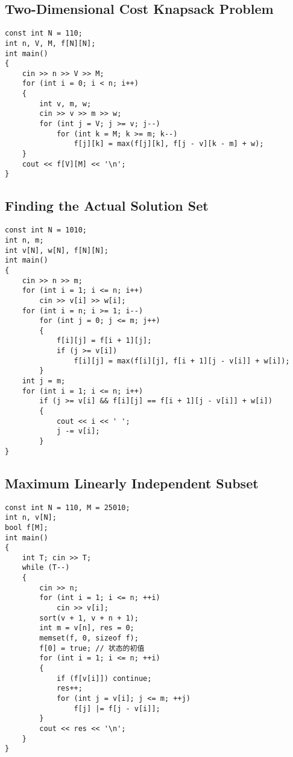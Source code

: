 \subsection{Two-Dimensional Cost Knapsack Problem}
\begin{lstlisting}
const int N = 110;
int n, V, M, f[N][N];
int main()
{
    cin >> n >> V >> M;
    for (int i = 0; i < n; i++)
    {
        int v, m, w;
        cin >> v >> m >> w;
        for (int j = V; j >= v; j--)
            for (int k = M; k >= m; k--)
                f[j][k] = max(f[j][k], f[j - v][k - m] + w);
    }
    cout << f[V][M] << '\n';
}
\end{lstlisting}
\subsection{Finding the Actual Solution Set}
\begin{lstlisting}
const int N = 1010;
int n, m;
int v[N], w[N], f[N][N];
int main()
{
    cin >> n >> m;
    for (int i = 1; i <= n; i++)
        cin >> v[i] >> w[i];
    for (int i = n; i >= 1; i--)
        for (int j = 0; j <= m; j++)
        {
            f[i][j] = f[i + 1][j];
            if (j >= v[i])
                f[i][j] = max(f[i][j], f[i + 1][j - v[i]] + w[i]);
        }
    int j = m;
    for (int i = 1; i <= n; i++)
        if (j >= v[i] && f[i][j] == f[i + 1][j - v[i]] + w[i])
        {
            cout << i << ' ';
            j -= v[i];
        }
}
\end{lstlisting}
\subsection{Maximum Linearly Independent Subset}
\begin{lstlisting}
const int N = 110, M = 25010;
int n, v[N];
bool f[M];
int main()
{
    int T; cin >> T;
    while (T--)
    {
        cin >> n;
        for (int i = 1; i <= n; ++i)
            cin >> v[i];
        sort(v + 1, v + n + 1);
        int m = v[n], res = 0;
        memset(f, 0, sizeof f);
        f[0] = true; // 状态的初值
        for (int i = 1; i <= n; ++i)
        {
            if (f[v[i]]) continue;
            res++;
            for (int j = v[i]; j <= m; ++j)
                f[j] |= f[j - v[i]];
        }
        cout << res << '\n';
    }
}
\end{lstlisting}
